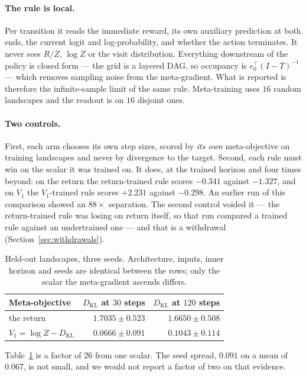 \documentclass[11pt]{article}
\theoremstyle{remark}
\newcommand{\KL}{D_{\mathrm{KL}}}
\begin{document}
\paragraph{The rule is local.} Per transition it reads the immediate reward, its
own auxiliary prediction at both ends, the current logit and log-probability, and
whether the action terminates. It never sees $R/Z$, $\log Z$ or the visit
distribution. Everything downstream of the policy is closed form --- the grid is
a layered DAG, so occupancy is $e_0^\top (I - T)^{-1}$ --- which removes sampling
noise from the meta-gradient. What is reported is therefore the infinite-sample
limit of the same rule. Meta-training uses $16$ random landscapes and the readout
is on $16$ disjoint ones.

\paragraph{Two controls.} First, each arm chooses its own step sizes, scored by
\emph{its own} meta-objective on training landscapes and never by divergence to
the target. Second, each rule must win on the scalar it was trained on. It does,
at the trained horizon and four times beyond: on the return the return-trained
rule scores $-0.341$ against $-1.327$, and on $V_1$ the $V_1$-trained rule scores
$+2.231$ against $-0.298$. An earlier run of this comparison showed an $88\times$
separation. The second control voided it --- the return-trained rule was losing
on return itself, so that run compared a trained rule against an undertrained one
--- and that is a withdrawal (Section~\ref{sec:withdrawals}).

\begin{table}[t]
\centering
\begin{tabular}{lrr}
\toprule
Meta-objective & $\KL$ at $30$ steps & $\KL$ at $120$ steps \\
\midrule
the return & $1.7035 \pm 0.523$ & $1.6650 \pm 0.508$ \\
$V_1 = \log Z - \KL$ & $\mathbf{0.0666 \pm 0.091}$ & $0.1043 \pm 0.114$ \\
\bottomrule
\end{tabular}
\caption{Held-out landscapes, three seeds. Architecture, inputs, inner horizon
and seeds are identical between the rows; only the scalar the meta-gradient
ascends differs.}
\label{tab:meta}
\end{table}

Table~\ref{tab:meta} is a factor of $26$ from one scalar. The seed spread,
$0.091$ on a mean of $0.067$, is not small, and we would not report a factor of
two on that evidence.
\end{document}
